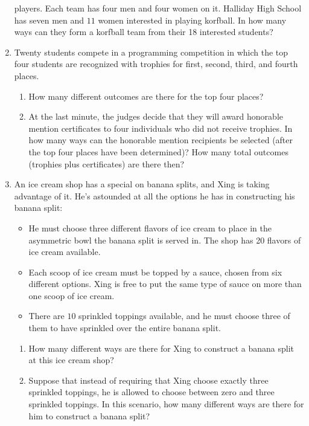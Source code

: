 \begin{enumerate}
    players. Each team has four men and four women on it. Halliday
    High School has seven men and $11$ women interested in playing
    korfball. In how many ways can they form a korfball team from their
    18 interested students?
  \item Twenty students compete in a programming competition in which
    the top four students are recognized with trophies for first,
    second, third, and fourth places.
    \begin{enumerate}
    \item How many different outcomes are there for the top four
      places?
    \item At the last minute, the judges decide that they will award
      honorable mention certificates to four individuals who did not
      receive trophies. In how many ways can the honorable mention
      recipients be selected (after the top four places have been
      determined)? How many total outcomes (trophies plus
      certificates) are there then?
    \end{enumerate}
  \item An ice cream shop has a special on banana splits, and Xing is
    taking advantage of it. He's astounded at all the options he has
    in constructing his banana split:
    \begin{itemize}
    \item He must choose three different flavors of ice cream to place
      in the asymmetric bowl the banana split is served in. The shop
      has 20 flavors of ice cream available.
    \item Each scoop of ice cream must be topped by a sauce, chosen
      from six different options. Xing is free to put the same type of
      sauce on more than one scoop of ice cream.
    \item There are $10$ sprinkled toppings available, and he must
      choose three of them to have sprinkled over the entire banana
      split.
    \end{itemize}
    \begin{enumerate}
    \item How many different ways are there for Xing to construct a
      banana split at this ice cream shop?
    \item Suppose that instead of requiring that Xing choose exactly
      three sprinkled toppings, he is allowed to choose between zero
      and three sprinkled toppings. In this scenario, how many
      different ways are there for him to construct a banana split?
    \end{enumerate}

\end{enumerate}
